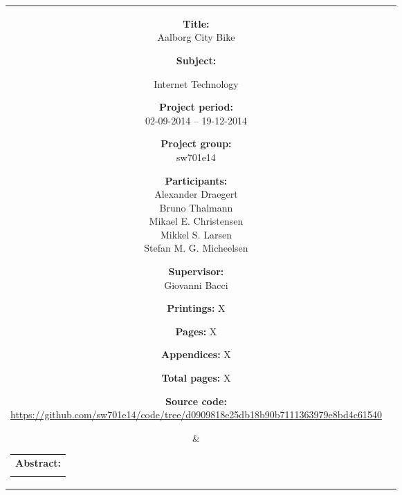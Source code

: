 \begin{titlepage}
\begin{nopagebreak}
{\begin{tabular}{cc}
	\parbox{7cm}{
	\begin{description}
		\item { \textbf{Title:}}\\
			Aalborg City Bike
    		\item { \textbf{Subject:}}\\
			\raggedright Internet Technology
		\item { \textbf{Project period:}}\\
			02-09-2014 -- 19-12-2014
 		\hspace{4cm}
		\item { \textbf{Project group:}}\\
  			sw701e14
 		\hspace{4cm}
		\item {\textbf{Participants:}}\\
			Alexander Draegert\\
			Bruno Thalmann\\
			Mikael E. Christensen\\
			Mikkel S. Larsen\\
			Stefan M. G. Micheelsen
		\item { \textbf{Supervisor:}}\\
 			Giovanni Bacci
		\item { \textbf{Printings:} X }
		\item { \textbf{Pages:} X } 
		\item { \textbf{Appendices:} X }
		\item { \textbf{Total pages:} X }
		\item { \textbf{Source code:}\\ {\small \url{https://github.com/sw701e14/code/tree/d0909818e25db18b90b7111363979e8bd4c61540}}}
	\end{description}
	\vfill } &
	\parbox{6.5cm}{
 	 \vspace{.15cm}
  	\hfill 
  	\begin{tabular}{l}
  		{ \textbf{Abstract:}}\bigskip \\
  		\fbox{
  		\parbox{8cm}{\bigskip
     		{\vfill{\footnotesize 
     		\bigskip}}
     	}}
   	\end{tabular}}
\end{tabular}
}%
\\
\vfill
\begin{center}
\end{center}
\end{nopagebreak}
\end{titlepage}